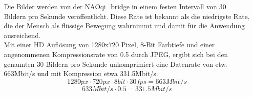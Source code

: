 Die Bilder werden von der NAOqi\_bridge in einem festen Intervall von 30 Bildern pro Sekunde veröffentlicht. Diese Rate ist bekannt als die niedrigste Rate, die der Mensch als flüssige Bewegung wahrnimmt und damit für die Anwendung ausreichend.\\
Mit einer \ac{HD} Auflösung von 1280x720 Pixel, 8-Bit Farbtiefe und einer angenommenen Kompressionsrate von 0.5 durch \ac{JPEG}, ergibt sich bei den genannten 30 Bildern pro Sekunde unkomprimiert eine Datenrate von etw. 663Mbit/s und mit Kompression etwa 331.5Mbit/s.\\
\begin{equation}
    1280px \cdot 720px \cdot 8bit \cdot 30fps = 663Mbit/s
    \label{eq:datenrate}
\end{equation}
\begin{equation}
    633Mbit/s \cdot 0.5 = 331.5Mbit/s
    \label{eq:datenrate-komprimiert}
\end{equation}

